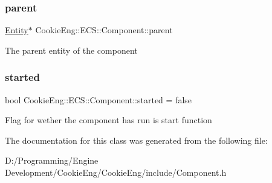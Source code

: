 \subsubsection{\texorpdfstring{parent}{parent}}
{\footnotesize\ttfamily \hyperlink{class_cookie_eng_1_1_e_c_s_1_1_entity}{Entity}$\ast$ Cookie\+Eng\+::\+E\+C\+S\+::\+Component\+::parent}

The parent entity of the component \mbox{\label{class_cookie_eng_1_1_e_c_s_1_1_component_aa7129172e0881ed80dbc6256570ad998}} 
\subsubsection{\texorpdfstring{started}{started}}
{\footnotesize\ttfamily bool Cookie\+Eng\+::\+E\+C\+S\+::\+Component\+::started = false}

Flag for wether the component has run is start function 

The documentation for this class was generated from the following file\+:\begin{DoxyCompactItemize}
\item 
D\+:/\+Programming/\+Engine Development/\+Cookie\+Eng/\+Cookie\+Eng/include/Component.\+h\end{DoxyCompactItemize}

